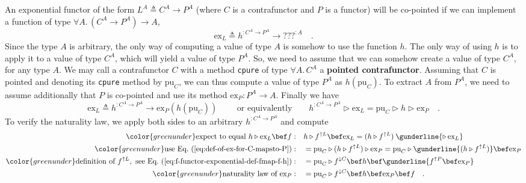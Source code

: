 An exponential functor of the form $L^{A}\triangleq C^{A}\rightarrow P^{A}$
(where $C$ is a contrafunctor and $P$ is a functor) will be co-pointed
if we can implement a function of type $\forall A.\,(C^{A}\rightarrow P^{A})\rightarrow A$,
\[
\text{ex}_{L}\triangleq h^{:C^{A}\rightarrow P^{A}}\rightarrow\text{???}^{:A}\quad.
\]
Since the type $A$ is arbitrary, the only way of computing a value
of type $A$ is somehow to use the function $h$. The only way of
using $h$ is to apply it to a value of type $C^{A}$, which will
yield a value of type $P^{A}$. So, we need to assume that we can
somehow create a value of type $C^{A}$, for any type $A$. We may
call a contrafunctor $C$ with a method \lstinline!cpure! of type
$\forall A.\,C^{A}$ a \textbf{pointed contrafunctor}.
Assuming that $C$ is pointed and denoting its \lstinline!cpure!
method by $\text{pu}_{C}$, we can thus compute a value of type $P^{A}$
as $h(\text{pu}_{C})$. To extract $A$ from $P^{A}$, we need to
assume additionally that $P$ is co-pointed and use its method $\text{ex}_{P}:P^{A}\rightarrow A$.
Finally we have
\begin{equation}
\text{ex}_{L}\triangleq h^{:C^{A}\rightarrow P^{A}}\rightarrow\text{ex}_{P}(h(\text{pu}_{C}))\quad\quad\text{ or equivalently}\quad\quad h^{:C^{A}\rightarrow P^{A}}\triangleright\text{ex}_{L}=\text{pu}_{C}\triangleright h\triangleright\text{ex}_{P}\quad.\label{eq:def-of-ex-for-C-mapsto-P}
\end{equation}
To verify the naturality law, we apply both sides to an arbitrary
$h^{:C^{A}\rightarrow P^{A}}$ and compute
\begin{align*}
{\color{greenunder}\text{expect to equal }h\triangleright\text{ex}_{L}\bef f:}\quad & h\triangleright f^{\uparrow L}\bef\text{ex}_{L}=(h\triangleright f^{\uparrow L})\:\gunderline{\triangleright\,\text{ex}_{L}}\\
{\color{greenunder}\text{use Eq.~(\ref{eq:def-of-ex-for-C-mapsto-P})}:}\quad & =\text{pu}_{C}\triangleright(h\triangleright f^{\uparrow L})\triangleright\text{ex}_{P}=\text{pu}_{C}\triangleright\gunderline{(h\triangleright f^{\uparrow L})}\bef\text{ex}_{P}\\
{\color{greenunder}\text{definition of }f^{\uparrow L},\text{ see Eq.~(\ref{eq:f-functor-exponential-def-fmap-f-h})}:}\quad & =\text{pu}_{C}\triangleright f^{\downarrow C}\bef h\bef\gunderline{f^{\uparrow P}\bef\text{ex}_{P}}\\
{\color{greenunder}\text{naturality law of }\text{ex}_{P}:}\quad & =\text{pu}_{C}\triangleright f^{\downarrow C}\bef h\bef\text{ex}_{P}\bef f\quad.
\end{align*}
